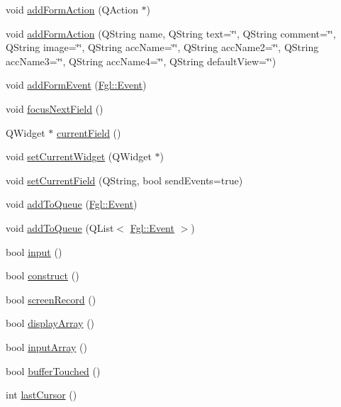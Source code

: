 \begin{DoxyCompactItemize}
\item 
void \hyperlink{classFglForm_ac43c7da12a298a241c7c98cf9a688a6f}{addFormAction} (QAction $\ast$)
\item 
void \hyperlink{classFglForm_a21e61578024f5922c949b4c2870684d4}{addFormAction} (QString name, QString text=\char`\"{}\char`\"{}, QString comment=\char`\"{}\char`\"{}, QString image=\char`\"{}\char`\"{}, QString accName=\char`\"{}\char`\"{}, QString accName2=\char`\"{}\char`\"{}, QString accName3=\char`\"{}\char`\"{}, QString accName4=\char`\"{}\char`\"{}, QString defaultView=\char`\"{}\char`\"{})
\item 
void \hyperlink{classFglForm_abadbd33d56f9bc46b3421f8fe0628952}{addFormEvent} (\hyperlink{structFgl_1_1Event}{Fgl::Event})
\item 
void \hyperlink{classFglForm_a5f3fea57cf46e7d548912efdaffa35f9}{focusNextField} ()
\item 
QWidget $\ast$ \hyperlink{classFglForm_a74cb6310512352e1fd501efbcd88724b}{currentField} ()
\item 
void \hyperlink{classFglForm_ac521356370affcf115340e2279475c6b}{setCurrentWidget} (QWidget $\ast$)
\item 
void \hyperlink{classFglForm_a4574756e714c6d93e6d177ecbfb78ae1}{setCurrentField} (QString, bool sendEvents=true)
\item 
void \hyperlink{classFglForm_a82a066a47d5d8bc2f7c2ec41ab29d4f2}{addToQueue} (\hyperlink{structFgl_1_1Event}{Fgl::Event})
\item 
void \hyperlink{classFglForm_a21e6b7f851487d6d0db29b015a37e374}{addToQueue} (QList$<$ \hyperlink{structFgl_1_1Event}{Fgl::Event} $>$)
\item 
bool \hyperlink{classFglForm_ab6b474ce22c93c45ccbee4b637647732}{input} ()
\item 
bool \hyperlink{classFglForm_ab131183405b70a2d48643ec9a522f877}{construct} ()
\item 
bool \hyperlink{classFglForm_a2e45f9d338ef208ffb1c08f1f97e6b2b}{screenRecord} ()
\item 
bool \hyperlink{classFglForm_a77b1a70cf1fff7d103b8c1895b3302c4}{displayArray} ()
\item 
bool \hyperlink{classFglForm_a452b19a215f6acbb86320ed3a8b32ead}{inputArray} ()
\item 
bool \hyperlink{classFglForm_ae6cab599f897bf58335df99e6d43b72d}{bufferTouched} ()
\item 
int \hyperlink{classFglForm_aab860a48ab46e95732543f3cb345ba26}{lastCursor} ()
\item 

\end{DoxyCompactItemize}
